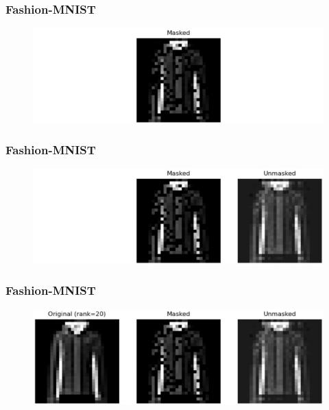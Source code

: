 \documentclass[
	11pt, %
]{beamer}
\begin{document}
\begin{frame}
	\frametitle{Fashion-MNIST}
	\begin{figure}
		\centering
		\includegraphics[scale=.3]{assets/mc_ex2_masked.jpg}
	\end{figure}
\end{frame}

\begin{frame}
	\frametitle{Fashion-MNIST}
	\begin{figure}
		\centering
		\includegraphics[scale=.3]{assets/mc_ex2_unmasked.jpg}
	\end{figure}
\end{frame}

\begin{frame}
	\frametitle{Fashion-MNIST}
	\begin{figure}
		\centering
		\includegraphics[scale=.3]{assets/mc_ex2_orig.jpg}
	\end{figure}
\end{frame}


\end{document}
